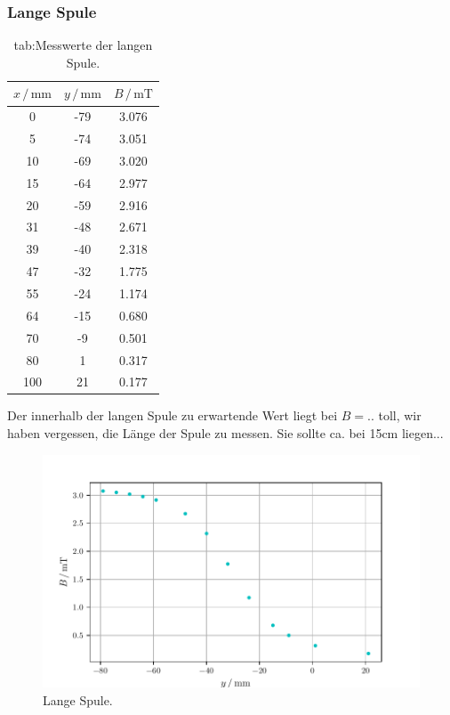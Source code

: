     \subsubsection{Lange Spule}
    \begin{table}
    \centering
    \caption{tab:Messwerte der langen Spule.}
    \label{tab:langSp}
        \begin{tabular}{S[table-format=3.0] S[table-format=2.0] S[table-format=2.2]}
            \toprule
            {$x\,/\,\mathrm{mm}$} & {$y\,/\,\mathrm{mm}$} & {$B\,/\,\mathrm{mT}$}\\
               & -79   & 3.076 \\
            5   & -74   & 3.051 \\
            10  & -69   & 3.020 \\
            15  & -64   & 2.977 \\
            20  & -59   & 2.916 \\
            31  & -48   & 2.671 \\
            39  & -40   & 2.318 \\
            47  & -32   & 1.775 \\
            55  & -24   & 1.174 \\
            64  & -15   & 0.680 \\
            70  & -9    & 0.501 \\
            80  & 1     & 0.317 \\
            100 & 21    & 0.177 \\
            \bottomrule
        \end{tabular}
    \end{table}
    Der innerhalb der langen Spule zu erwartende Wert liegt bei $B=$.. toll, wir haben vergessen, die Länge der Spule zu messen.
    Sie sollte ca. bei 15cm liegen... 
    \begin{figure}
        \centering
        \includegraphics[width=\textwidth]{Plots/plot_langSp.pdf}
        \caption{Lange Spule.}
        \label{fig:lang}
    \end{figure}